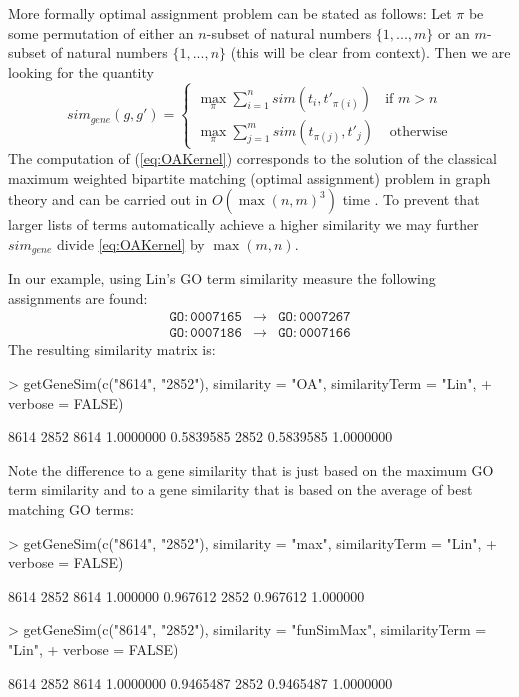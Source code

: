 \documentclass[12pt,a4paper]{article}
\begin{document}
More formally optimal assignment problem can be stated as follows: Let $\pi$ be some permutation of either an $n$-subset of natural numbers
$\{1,...,m\}$ or an $m$-subset of natural numbers $\{1,...,n\}$ (this will
be clear from context). Then we are looking for the quantity
\begin{equation}
sim_{gene}(g,g')=\left\{ \begin{array}{cc}
\max_{\pi}\sum_{i=1}^{n}sim(t_{i},t'_{\pi(i)}) & \textrm{if }m>n\\
\max_{\pi}\sum_{j=1}^{m}sim(t_{\pi(j)},t'_{j}) & \textrm{ otherwise}
\end{array}\right.\label{eq:OAKernel}
\end{equation}
The computation of (\ref{eq:OAKernel}) corresponds to the solution
of the classical maximum weighted bipartite matching (optimal assignment)
problem in graph theory and can be carried out in $O(\max(n,m)^{3})$
time \cite{LEDABook99}. 
To prevent that larger lists of terms automatically
achieve a higher similarity we may further $sim_{gene}$ divide \ref{eq:OAKernel} by $\max(m,n)$.

In our example, using Lin's GO term similarity measure the following assignments are found:
\begin{eqnarray}
\mathtt{GO:0007165} & \to & \mathtt{GO:0007267}\\
\mathtt{GO:0007186} & \to & \mathtt{GO:0007166}
\end{eqnarray}
The resulting similarity matrix is:
\begin{Schunk}
\begin{Sinput}
> getGeneSim(c("8614", "2852"), similarity = "OA", similarityTerm = "Lin", 
+     verbose = FALSE)
\end{Sinput}
\begin{Soutput}
          8614      2852
8614 1.0000000 0.5839585
2852 0.5839585 1.0000000
\end{Soutput}
\end{Schunk}

Note the difference to a gene similarity that is just based on the maximum GO term similarity and to a gene similarity that is based on the average of best matching GO terms:
\begin{Schunk}
\begin{Sinput}
> getGeneSim(c("8614", "2852"), similarity = "max", similarityTerm = "Lin", 
+     verbose = FALSE)
\end{Sinput}
\begin{Soutput}
         8614     2852
8614 1.000000 0.967612
2852 0.967612 1.000000
\end{Soutput}
\begin{Sinput}
> getGeneSim(c("8614", "2852"), similarity = "funSimMax", similarityTerm = "Lin", 
+     verbose = FALSE)
\end{Sinput}
\begin{Soutput}
          8614      2852
8614 1.0000000 0.9465487
2852 0.9465487 1.0000000
\end{Soutput}
\end{Schunk}
\end{document}

